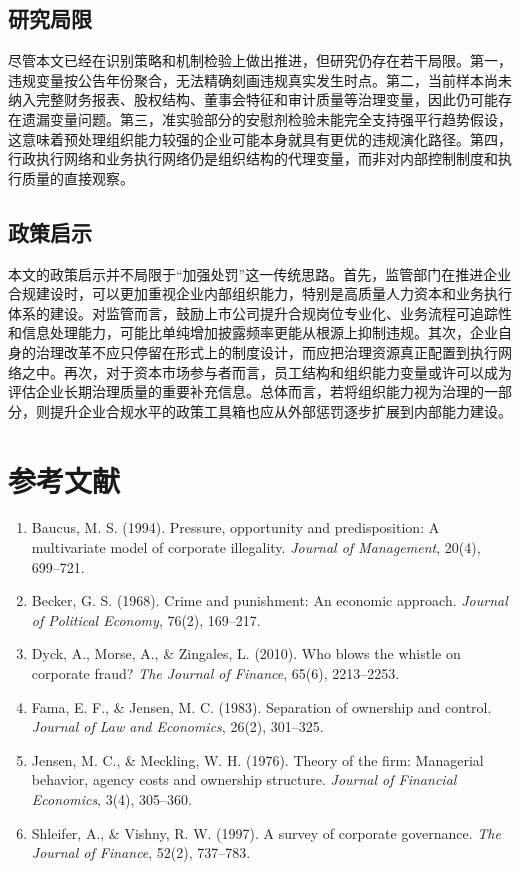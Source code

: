 \documentclass[12pt]{ctexart}
\begin{document}
\subsection*{研究局限}
尽管本文已经在识别策略和机制检验上做出推进，但研究仍存在若干局限。第一，违规变量按公告年份聚合，无法精确刻画违规真实发生时点。第二，当前样本尚未纳入完整财务报表、股权结构、董事会特征和审计质量等治理变量，因此仍可能存在遗漏变量问题。第三，准实验部分的安慰剂检验未能完全支持强平行趋势假设，这意味着预处理组织能力较强的企业可能本身就具有更优的违规演化路径。第四，行政执行网络和业务执行网络仍是组织结构的代理变量，而非对内部控制制度和执行质量的直接观察。

\subsection*{政策启示}
本文的政策启示并不局限于“加强处罚”这一传统思路。首先，监管部门在推进企业合规建设时，可以更加重视企业内部组织能力，特别是高质量人力资本和业务执行体系的建设。对监管而言，鼓励上市公司提升合规岗位专业化、业务流程可追踪性和信息处理能力，可能比单纯增加披露频率更能从根源上抑制违规。其次，企业自身的治理改革不应只停留在形式上的制度设计，而应把治理资源真正配置到执行网络之中。再次，对于资本市场参与者而言，员工结构和组织能力变量或许可以成为评估企业长期治理质量的重要补充信息。总体而言，若将组织能力视为治理的一部分，则提升企业合规水平的政策工具箱也应从外部惩罚逐步扩展到内部能力建设。

\section*{参考文献}
\begin{enumerate}
\item Baucus, M. S. (1994). Pressure, opportunity and predisposition: A multivariate model of corporate illegality. \textit{Journal of Management}, 20(4), 699--721.
\item Becker, G. S. (1968). Crime and punishment: An economic approach. \textit{Journal of Political Economy}, 76(2), 169--217.
\item Dyck, A., Morse, A., \& Zingales, L. (2010). Who blows the whistle on corporate fraud? \textit{The Journal of Finance}, 65(6), 2213--2253.
\item Fama, E. F., \& Jensen, M. C. (1983). Separation of ownership and control. \textit{Journal of Law and Economics}, 26(2), 301--325.
\item Jensen, M. C., \& Meckling, W. H. (1976). Theory of the firm: Managerial behavior, agency costs and ownership structure. \textit{Journal of Financial Economics}, 3(4), 305--360.
\item Shleifer, A., \& Vishny, R. W. (1997). A survey of corporate governance. \textit{The Journal of Finance}, 52(2), 737--783.
\end{enumerate}
\end{document}

